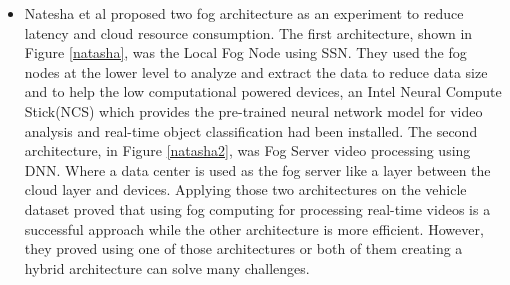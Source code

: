 \documentclass[12pt]{article}
\begin{document}
\begin{itemize}
\item Natesha et al \cite{nateshafog} proposed two fog architecture as an experiment to reduce latency and cloud resource consumption. The first architecture, shown in Figure \ref{natasha}, was the Local Fog Node using SSN. They used the fog nodes at the lower level to analyze and extract the data to reduce data size and to help the low computational powered devices, an Intel Neural Compute Stick(NCS) which provides the pre-trained neural network model for video analysis and real-time object classification had been installed. The second architecture, in Figure \ref{natasha2}, was Fog Server video processing using DNN. Where a  data center is used as the fog server like a layer between the cloud layer and devices. Applying those two architectures on the vehicle dataset proved that using fog computing for processing real-time videos is a successful approach while the other architecture is more efficient. However, they proved using one of those architectures or both of them creating a hybrid architecture can solve many challenges.


\end{itemize}
\end{document}
